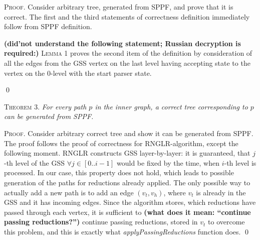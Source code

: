 \textsc{Proof.} Consider arbitrary tree, generated from SPPF, and prove that it is correct. The first and the third statements
of correctness definition immediately follow from SPPF definition. 

{\bf (did'not understand the following statement; Russian decryption is required:)}
\textsc{Lemma 1} proves the second item of the definition by consideration of all the edges from the GSS vertex
on the last level having accepting state to the vertex on the 0-level with the start parser state.

\qed

\textsc{Theorem 3.} 
\textit{For every path $p$ in the inner graph, a correct tree corresponding to $p$ can be generated from SPPF.}

\textsc{Proof.}
Consider arbitrary correct tree and show it can be generated from SPPF. The proof follows the proof of correctness 
for RNGLR-algorithm, except the following moment. RNGLR constructs GSS layer-by-layer: it is guaranteed, that $j$-th 
level of the GSS $\forall j \in [0..i-1]$ would be fixed by the time, when $i$-th level is processed. In our case, 
this property does not hold, which leads to possible generation of the paths for reductions already applied. 
The only possible way to actually add a new path is to add an edge $(v_{t}, v_{h})$, where $v_{t}$ is already in the GSS and 
it has incoming edges. Since the algorithm stores, which reductions have passed through each vertex, it is sufficient to 
{\bf (what does it mean: ``continue passing reductions?'')} continue passing reductions, stored in $v_{t}$ to overcome this problem, 
and this is exactly what \emph{applyPassingReductions} function does. 
\qed
